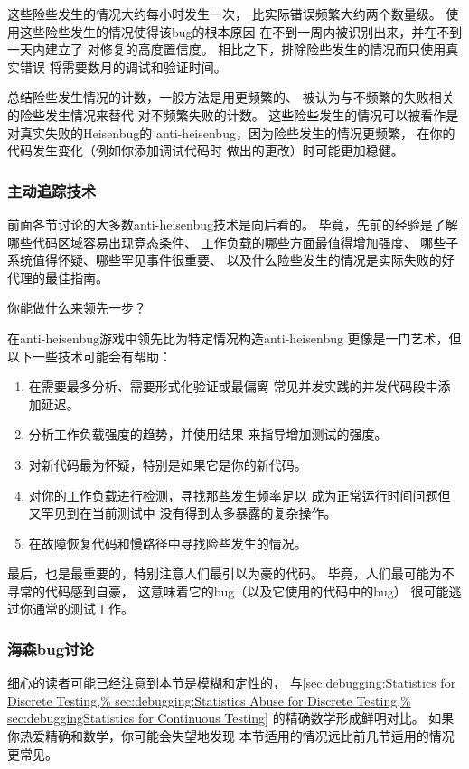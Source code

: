 这些险些发生的情况大约每小时发生一次，
比实际错误频繁大约两个数量级。
使用这些险些发生的情况使得该bug的根本原因
在不到一周内被识别出来，并在不到一天内建立了
对修复的高度置信度。
相比之下，排除险些发生的情况而只使用真实错误
将需要数月的调试和验证时间。

总结险些发生情况的计数，一般方法是用更频繁的、
被认为与不频繁的失败相关的险些发生情况来替代
对不频繁失败的计数。
这些险些发生的情况可以被看作是对真实失败的Heisenbug的
anti-heisenbug，因为险些发生的情况更频繁，
在你的代码发生变化（例如你添加调试代码时
做出的更改）时可能更加稳健。

\subsubsection{主动追踪技术}
\label{sec:debugging:Proactive Hunting Techniques}

前面各节讨论的大多数anti-heisenbug技术是向后看的。
毕竟，先前的经验是了解哪些代码区域容易出现竞态条件、
工作负载的哪些方面最值得增加强度、
哪些子系统值得怀疑、哪些罕见事件很重要、
以及什么险些发生的情况是实际失败的好代理的最佳指南。

你能做什么来领先一步？

在anti-heisenbug游戏中领先比为特定情况构造anti-heisenbug
更像是一门艺术，但以下一些技术可能会有帮助：

\begin{enumerate}
\item	在需要最多分析、需要形式化验证或最偏离
	常见并发实践的并发代码段中添加延迟。
\item	分析工作负载强度的趋势，并使用结果
	来指导增加测试的强度。
\item	对新代码最为怀疑，特别是如果它是你的新代码。
\item	对你的工作负载进行检测，寻找那些发生频率足以
	成为正常运行时间问题但又罕见到在当前测试中
	没有得到太多暴露的复杂操作。
\item	在故障恢复代码和慢路径中寻找险些发生的情况。
\end{enumerate}

最后，也是最重要的，特别注意人们最引以为豪的代码。
毕竟，人们最可能为不寻常的代码感到自豪，
这意味着它的bug（以及它使用的代码中的bug）
很可能逃过你通常的测试工作。

\subsubsection{海森bug讨论}
\label{sec:debugging:Heisenbug Discussion}

细心的读者可能已经注意到本节是模糊和定性的，
与\cref{sec:debugging:Statistics for Discrete Testing,%
sec:debugging:Statistics Abuse for Discrete Testing,%
sec:debuggingStatistics for Continuous Testing}
的精确数学形成鲜明对比。
如果你热爱精确和数学，你可能会失望地发现
本节适用的情况远比前几节适用的情况更常见。

